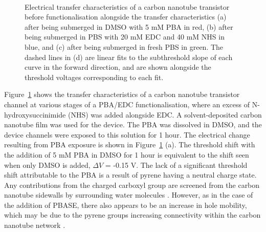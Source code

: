 \documentclass[
  a4paper,
]{scrbook}
\begin{document}
\begin{figure}
\begin{minipage}[t]{0.45\linewidth}
{{}

}

\end{minipage}%
%
\begin{minipage}[t]{0.01\linewidth}

{\centering 

~

}

\end{minipage}%

\caption[Electrical transfer characteristics of a carbon nanotube
transistor, before and after functionalisation with PBA or PBA/EDC/NHS,
as well as after submersion in fresh PBS, alongside linear fits to the
subthreshold slope of each curve in the forward
direction.]{\label{fig-pba-functionalisation-threshold-shift}Electrical
transfer characteristics of a carbon nanotube transistor before
functionalisation alongside the transfer characteristics (a) after being
submerged in DMSO with 5 mM PBA in red, (b) after being submerged in PBS
with 20 mM EDC and 40 mM NHS in blue, and (c) after being submerged in
fresh PBS in green. The dashed lines in (d) are linear fits to the
subthreshold slope of each curve in the forward direction, and are shown
alongside the threshold voltages corresponding to each fit.}

\end{figure}

Figure~\ref{fig-pba-functionalisation-threshold-shift} shows the
transfer characteristics of a carbon nanotube transistor channel at
various stages of a PBA/EDC functionalisation, where an excess of
N-hydroxysuccinimide (NHS) was added alongside EDC. A solvent-deposited
carbon nanotube film was used for the device. The PBA was dissolved in
DMSO, and the device channels were exposed to this solution for 1 hour.
The electrical change resulting from PBA exposure is shown in
Figure~\ref{fig-pba-functionalisation-threshold-shift} (a). The
threshold shift with the addition of 5 mM PBA in DMSO for 1 hour is
equivalent to the shift seen when only DMSO is added, \(\Delta V\) =
-0.15 V. The lack of a significant threshold shift attributable to the
PBA is a result of pyrene having a neutral charge state. Any
contributions from the charged carboxyl group are screened from the
carbon nanotube sidewalls by surrounding water molecules
\autocite{Lerner2012}. However, as in the case of the addition of PBASE,
there also appears to be an increase in hole mobility, which may be due
to the pyrene groups increasing connectivity within the carbon nanotube
network \autocite{Murugathas2019a}.
\end{document}
